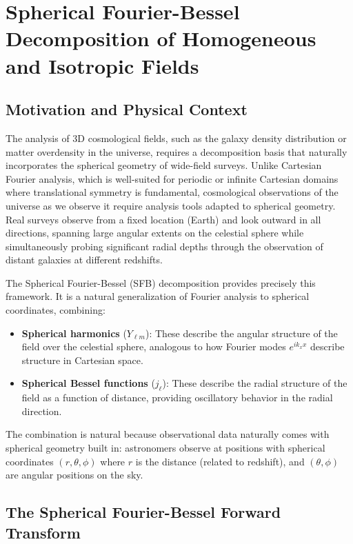 \section{Spherical Fourier-Bessel Decomposition of Homogeneous and Isotropic Fields}

\subsection{Motivation and Physical Context}

The analysis of 3D cosmological fields, such as the galaxy density distribution or matter overdensity in the universe, requires a decomposition basis that naturally incorporates the spherical geometry of wide-field surveys. Unlike Cartesian Fourier analysis, which is well-suited for periodic or infinite Cartesian domains where translational symmetry is fundamental, cosmological observations of the universe as we observe it require analysis tools adapted to spherical geometry. Real surveys observe from a fixed location (Earth) and look outward in all directions, spanning large angular extents on the celestial sphere while simultaneously probing significant radial depths through the observation of distant galaxies at different redshifts.

The Spherical Fourier-Bessel (SFB) decomposition provides precisely this framework. It is a natural generalization of Fourier analysis to spherical coordinates, combining:
\begin{itemize}
    \item \textbf{Spherical harmonics} ($Y_{\ell m}$): These describe the angular structure of the field over the celestial sphere, analogous to how Fourier modes $e^{i k_x x}$ describe structure in Cartesian space.
    \item \textbf{Spherical Bessel functions} ($j_\ell$): These describe the radial structure of the field as a function of distance, providing oscillatory behavior in the radial direction.
\end{itemize}

The combination is natural because observational data naturally comes with spherical geometry built in: astronomers observe at positions with spherical coordinates $(r, \theta, \phi)$ where $r$ is the distance (related to redshift), and $(\theta, \phi)$ are angular positions on the sky.

\subsection{The Spherical Fourier-Bessel Forward Transform}

